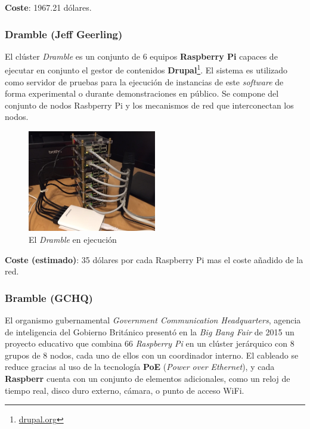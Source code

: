 \textbf{Coste}: 1967.21 dólares.

\subsubsection{Dramble (Jeff Geerling)}

El clúster \textit{Dramble} es un conjunto de 6 equipos \textbf{Raspberry Pi} capaces de ejecutar en conjunto el gestor de contenidos \textbf{Drupal}\footnote{\href{https://www.drupal.org/}{drupal.org}}. El sistema es utilizado como servidor de pruebas para la ejecución de instancias de este \textit{software} de forma experimental o durante demonstraciones en público\cite{geerlingraspberry}. Se compone del conjunto de nodos Rasbperry Pi y los mecanismos de red que interconectan los nodos.

\begin{figure}[H]
\centering
\includegraphics[width=0.5\textwidth]{Chapters/Chapter1/Figures/raspberry-pi-dramble-cluster-wired.jpg}
\caption{El \textit{Dramble} en ejecución}
\label{geerling:dramble}
\end{figure}

\textbf{Coste (estimado)}: 35 dólares por cada Raspberry Pi mas el coste añadido de la red.

\subsubsection{Bramble (GCHQ)}

El organismo gubernamental \textit{Government Communication Headquarters}, agencia de inteligencia del Gobierno Británico presentó en la \textit{Big Bang Fair} de 2015 un proyecto educativo que combina 66 \textit{Raspberry Pi} en un clúster jerárquico con 8 grupos de 8 nodos, cada uno de ellos con un coordinador interno. El cableado se reduce gracias al uso de la tecnología \textbf{PoE} (\textit{Power over Ethernet}), y cada \textbf{Raspberr} cuenta con un conjunto de elementos adicionales, como un reloj de tiempo real, disco duro externo, cámara, o punto de acceso WiFi\cite{gchqbramble}.


